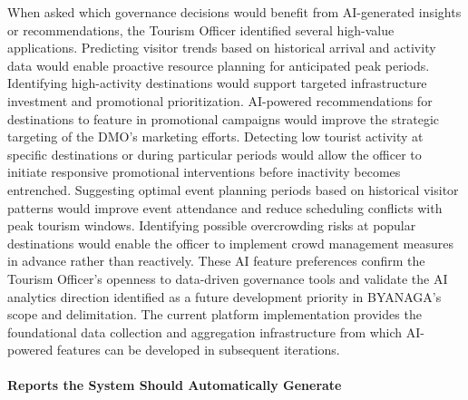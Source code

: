 \documentclass{research}
\begin{document}
When asked which governance decisions would benefit from AI-generated
insights or recommendations, the Tourism Officer identified several
high-value applications. Predicting visitor trends based on historical
arrival and activity data would enable proactive resource planning for
anticipated peak periods. Identifying high-activity destinations would
support targeted infrastructure investment and promotional prioritization.
AI-powered recommendations for destinations to feature in promotional
campaigns would improve the strategic targeting of the DMO's marketing
efforts. Detecting low tourist activity at specific destinations or
during particular periods would allow the officer to initiate responsive
promotional interventions before inactivity becomes entrenched. Suggesting
optimal event planning periods based on historical visitor patterns would
improve event attendance and reduce scheduling conflicts with peak tourism
windows. Identifying possible overcrowding risks at popular destinations
would enable the officer to implement crowd management measures in advance
rather than reactively. These AI feature preferences confirm the Tourism
Officer's openness to data-driven governance tools and validate the
AI analytics direction identified as a future development priority in
BYANAGA's scope and delimitation. The current platform implementation
provides the foundational data collection and aggregation infrastructure
from which AI-powered features can be developed in subsequent iterations.


\paragraph{Reports the System Should Automatically Generate}
\end{document}
